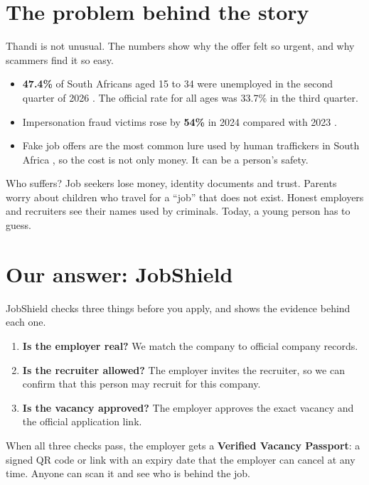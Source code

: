 \documentclass[11pt,a4paper]{article}
\begin{document}
\section{The problem behind the story}
Thandi is not unusual. The numbers show why the offer felt so urgent, and why scammers find it so easy.

\begin{itemize}
  \item \textbf{47.4\%} of South Africans aged 15 to 34 were unemployed in the second quarter of 2026 \cite{qlfs}. The official rate for all ages was 33.7\% in the third quarter.
  \item Impersonation fraud victims rose by \textbf{54\%} in 2024 compared with 2023 \cite{safps}.
  \item Fake job offers are the most common lure used by human traffickers in South Africa \cite{nfn}, so the cost is not only money. It can be a person's safety.
\end{itemize}

Who suffers? Job seekers lose money, identity documents and trust. Parents worry about children who travel for a ``job'' that does not exist. Honest employers and recruiters see their names used by criminals. Today, a young person has to guess.

\section{Our answer: JobShield}
JobShield checks three things before you apply, and shows the evidence behind each one.

\begin{enumerate}
  \item \textbf{Is the employer real?} We match the company to official company records.
  \item \textbf{Is the recruiter allowed?} The employer invites the recruiter, so we can confirm that this person may recruit for this company.
  \item \textbf{Is the vacancy approved?} The employer approves the exact vacancy and the official application link.
\end{enumerate}

When all three checks pass, the employer gets a \textbf{Verified Vacancy Passport}: a signed QR code or link with an expiry date that the employer can cancel at any time. Anyone can scan it and see who is behind the job.
\end{document}
